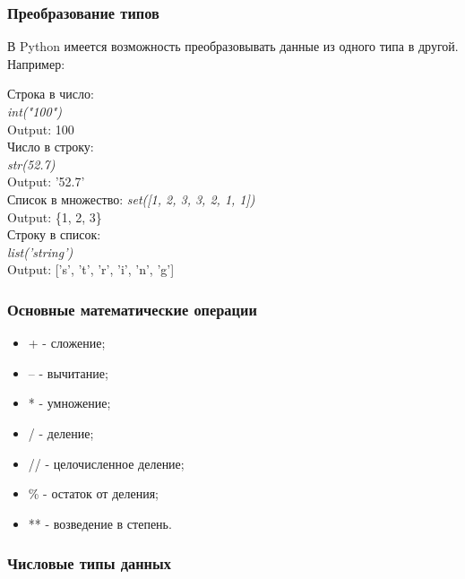 \subsubsection{Преобразование типов}

В Python имеется возможность преобразовывать данные из одного типа в другой. Например:

\begin{flushleft}
	Строка в число: \\
	\colorbox[rgb]{0.95, 0.95, 0.95}{\textit{int("100")}} \\
	\colorbox[rgb]{0.95, 0.95, 0.95}{Output: 100} \\
	\vspace{1cm}
	Число в строку: \\
	\colorbox[rgb]{0.95, 0.95, 0.95}{\textit{str(52.7)}} \\
	\colorbox[rgb]{0.95, 0.95, 0.95}{Output: '52.7'} \\
	\vspace{1cm}
	Список в множество:
	\colorbox[rgb]{0.95, 0.95, 0.95}{\textit{set([1, 2, 3, 3, 2, 1, 1])}} \\
	\colorbox[rgb]{0.95, 0.95, 0.95}{Output: \{1, 2, 3\}} \\
	\vspace{1cm}
	Строку в список: \\
	\colorbox[rgb]{0.95, 0.95, 0.95}{\textit{list('string')}} \\
	\colorbox[rgb]{0.95, 0.95, 0.95}{Output: ['s', 't', 'r', 'i', 'n', 'g']} \\
\end{flushleft}

\subsubsection{Основные математические операции}
\begin{itemize}
	\setlength\itemsep{0.01cm}
	\item[] + - сложение;
	\item[] -- - вычитание;
	\item[] * - умножение;
	\item[] / - деление;
	\item[] // - целочисленное деление;
	\item[] \% - остаток от деления;
	\item[] ** - возведение в степень.
\end{itemize}

\subsubsection{Числовые типы данных}

